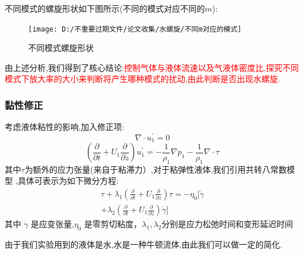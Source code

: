 \documentclass[UTF8]{gapd}
\begin{document}
不同模式的螺旋形状如下图所示(不同的模式对应不同的$m$):
\begin{figure}[!htbp]%
	\centering
	\texttt{[image: D:/不重要过期文件/论文收集/水螺旋/不同m对应的模式]}
	\caption{不同模式螺旋形状\cite{c3}}
	\label{fig:P2}%
\end{figure}

由上述分析,我们得到了核心结论:\textcolor{red}{控制气体与液体流速以及气液体密度比,探究不同模式下放大率的大小来判断将产生哪种模式的扰动,由此判断是否出现水螺旋.}

\subsubsection{黏性修正}
考虑液体粘性的影响,加入修正项:
\begin{equation}
\nabla \cdot u_{1}^{'}=0
\end{equation}
\begin{equation}
\left( \frac{\partial}{\partial t}+U_1\frac{\partial}{\partial z} \right) u_{1}^{'}=-\frac{1}{\rho _1}\nabla p_1-\frac{1}{\rho _1}\nabla \cdot \tau 
\end{equation}
其中$\tau$为额外的应力张量(来自于粘滞力）,对于粘弹性液体,我们引用共转八常数模型\cite{c4} ,具体可表示为如下微分方程:
\begin{equation}
\begin{split}
\tau+\lambda_{1}(\frac{\partial}{\partial t}+U_{1} \frac{\partial}{\partial z}) \tau=-\eta_{0}[\dot{\gamma}\\
+\lambda_{2}(\frac{\partial}{\partial t}+U_{1} \frac{\partial}{\partial z}) \dot{\gamma}]
\end{split}
\end{equation}
其中  $\dot{\gamma}$ 是应变张量,$\eta _0$  是零剪切粘度，$\lambda _1,\lambda _2$分别是应力松弛时间和变形延迟时间

由于我们实验用到的液体是水,水是一种牛顿流体,由此我们可以做一定的简化.
\end{document}
